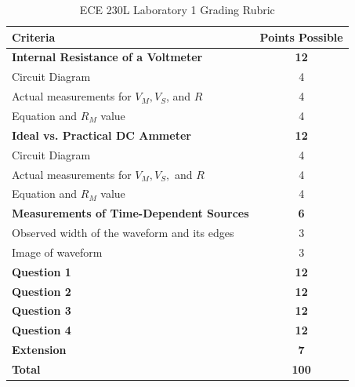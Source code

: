 \documentclass[12pt]{../manual}
\begin{document}
%
\newpage
{}
{}
\hspace{0pt}
\vfill
\begin{table}[ht!]
\caption{ECE 230L Laboratory 1 Grading Rubric}
\centering
\begin{tabular}{l|c} \hline
Criteria & Points Possible \\ \hline \hline
\textbf{Internal Resistance of a Voltmeter}					& \textbf{12} \\
Circuit Diagram												& 4 \\
Actual measurements for $V_M, V_S$, and $R$					& 4 \\
Equation and $R_M$ value									& 4 \\ \hline
\textbf{Ideal vs. Practical DC Ammeter}						& \textbf{12} \\
Circuit Diagram												& 4 \\
Actual measurements for $V_M, V_S,$ and $R$					& 4 \\
Equation and $R_M$ value									& 4 \\ \hline
\textbf{Measurements of Time-Dependent Sources}				& \textbf{6} \\
Observed width of the waveform and its edges				& 3 \\
Image of waveform 											& 3 \\ \hline
\textbf{Question 1}											& \textbf{12} \\ \hline
\textbf{Question 2}											& \textbf{12} \\ \hline
\textbf{Question 3}											& \textbf{12} \\ \hline
\textbf{Question 4}											& \textbf{12} \\ \hline
\textbf{Extension}											& \textbf{7} \\ \hline
\textbf{Total}												& \textbf{100} \\ \hline
\end{tabular}
\end{table}
\vfill
\hspace{0pt}
%
\end{document}
